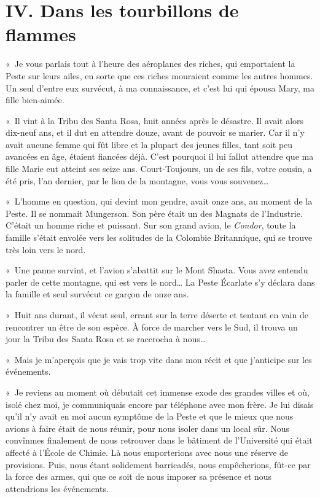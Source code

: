 \documentclass[french,twoside]{book} %
\newcommand\chapteropen{} %
\newcommand\chaptercont{} %
\begin{document}
\chapteropen

\chapter[{IV. Dans les tourbillons de flammes}]{IV. Dans les tourbillons de flammes}
\renewcommand{\leftmark}{IV. Dans les tourbillons de flammes}


\chaptercont
\noindent « Je vous parlais tout à l’heure des aéroplanes des riches, qui emportaient la Peste sur leurs ailes, en sorte que ces riches mouraient comme les autres hommes. Un seul d’entre eux survécut, à ma connaissance, et c’est lui qui épousa Mary, ma fille bien-aimée.\par
« Il vint à la Tribu des Santa Rosa, huit années après le désastre. Il avait alors dix-neuf ans, et il dut en attendre douze, avant de pouvoir se marier. Car il n’y avait aucune femme qui fût libre et la plupart des jeunes filles, tant soit peu avancées en âge, étaient fiancées déjà. C’est pourquoi il lui fallut attendre que ma fille Marie eut atteint ses seize ans. Court-Toujours, un de ses fils, votre cousin, a été pris, l’an dernier, par le lion de la montagne, vous vous souvenez…\par
« L’homme en question, qui devint mon gendre, avait onze ans, au moment de la Peste. Il se nommait Mungerson. Son père était un des Magnats de l’Industrie. C’était un homme riche et puissant. Sur son grand avion, le \emph{Condor}, toute la famille s’était envolée vers les solitudes de la Colombie Britannique, qui se trouve très loin vers le nord.\par
« Une panne survint, et l’avion s’abattit sur le Mont Shasta. Vous avez entendu parler de cette montagne, qui est vers le nord… La Peste Écarlate s’y déclara dans la famille et seul survécut ce garçon de onze ans.\par
« Huit ans durant, il vécut seul, errant sur la terre déserte et tentant en vain de rencontrer un être de son espèce. À force de marcher vers le Sud, il trouva un jour la Tribu des Santa Rosa et se raccrocha à nous…\par
« Mais je m’aperçois que je vais trop vite dans mon récit et que j’anticipe sur les événements.\par
« Je reviens au moment où débutait cet immense exode des grandes villes et où, isolé chez moi, je communiquais encore par téléphone avec mon frère. Je lui disais qu’il n’y avait en moi aucun symptôme de la Peste et que le mieux que nous avions à faire était de nous réunir, pour nous isoler dans un local sûr. Nous convînmes finalement de nous retrouver dans le bâtiment de l’Université qui était affecté à l’École de Chimie. Là nous emporterions avec nous une réserve de provisions. Puis, nous étant solidement barricadés, nous empêcherions, fût-ce par la force des armes, qui que ce soit de nous imposer sa présence et nous attendrions les événements.\par
\end{document}
